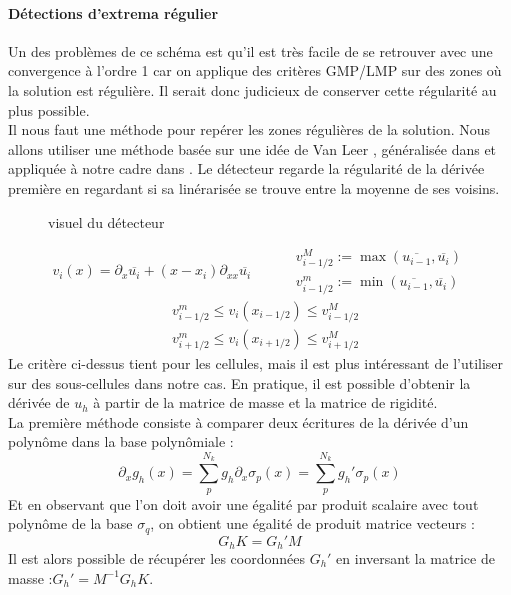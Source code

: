 \paragraph{Détections d'extrema régulier}
Un des problèmes de ce schéma est qu'il est très facile de se retrouver avec une convergence à l'ordre 1 
car on applique des critères GMP/LMP sur des zones où la solution est régulière. Il serait donc judicieux de conserver cette régularité au plus possible. \\
Il nous faut une méthode pour repérer les zones régulières de la solution. Nous allons utiliser une méthode basée sur une idée de Van Leer \cite{VANLEER1979101}, généralisée dans \cite{BURBEAU2001111} et appliquée à notre cadre dans \cite{VILAR2025}.
Le détecteur regarde la régularité de la dérivée première en regardant si sa linérarisée se trouve entre la moyenne de ses voisins. \\
\begin{figure} 
    \usebox{\detectextrema} 
    \caption{visuel du détecteur}
\end{figure}
\begin{equation*}
    v_i(x) = \partial_x \overline{{u}_{i}} +(x-x_i) \partial_{xx} \overline{{u}_i} \qquad
\begin{aligned}
    &v_{i-1/2}^M := \max(\overline{{u}_{i-1}},\overline{{u}_{i}}) \\
    &v_{i-1/2}^m := \min(\overline{{u}_{i-1}},\overline{{u}_{i}})
\end{aligned}
\end{equation*}
\begin{align}
    &v_{i-1/2}^m \leq v_i(x_{i-1/2}) \leq v_{i-1/2}^M \\
    &v_{i+1/2}^m \leq v_i(x_{i+1/2}) \leq v_{i+1/2}^M
\end{align}
Le critère ci-dessus tient pour les cellules, mais il est plus intéressant de l'utiliser sur des sous-cellules dans notre cas.
En pratique, il est possible d'obtenir la dérivée de $u_h$ à partir de la matrice de masse et la matrice de rigidité. \\
\noindent
La première méthode consiste à comparer deux écritures de la dérivée d'un polynôme dans la base polynômiale : 
$$  \partial_xg_h(x) = \sum_p^{N_k} g_h  \partial_x \sigma_p(x) = \sum_p^{N_k} g_h' \sigma_p(x) $$
Et en observant que l'on doit avoir une égalité par produit scalaire avec tout polynôme de la base $\sigma_q$, on obtient une égalité de produit matrice vecteurs : 
$$ G_h K = G_h' M$$
Il est alors possible de récupérer les coordonnées $G_h'$ en inversant la matrice de masse :$G_h' = M^{-1}G_h K$.\\
